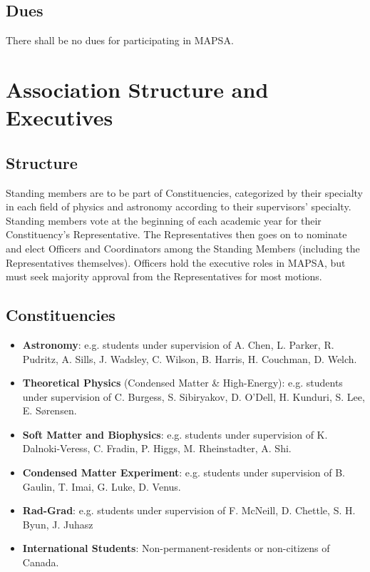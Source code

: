 \documentclass[8pt]{article}
\begin{document}
	\subsection{Dues}
	There shall be no dues for participating in MAPSA.
	
	\section{Association Structure and Executives}
	\subsection{Structure}\label{subsec:structure}
	Standing members are to be part of Constituencies, categorized by their specialty in each field of physics and astronomy according to their supervisors' specialty. Standing members vote at the beginning of each academic year for their Constituency's Representative. The Representatives then goes on to nominate and elect Officers and Coordinators among the Standing Members (including the Representatives themselves). Officers hold the executive roles in MAPSA, but must seek majority approval from the Representatives for most motions. 
	\subsection{Constituencies}
	\begin{itemize}
		\item \textbf{Astronomy}: e.g. students under supervision of A. Chen, L. Parker, R. Pudritz, A. Sills, J. Wadsley, C. Wilson, B. Harris, H. Couchman, D. Welch.
		\item \textbf{Theoretical Physics} (Condensed Matter \& High-Energy): e.g. students under supervision of C. Burgess, S. Sibiryakov, D. O'Dell, H. Kunduri, S. Lee, E. Sørensen.
		\item \textbf{Soft Matter and Biophysics}: e.g. students under supervision of K. Dalnoki-Veress, C. Fradin, P. Higgs, M. Rheinstadter, A. Shi.
		\item \textbf{Condensed Matter Experiment}: e.g. students under supervision of B. Gaulin, T. Imai, G. Luke, D. Venus.
		\item \textbf{Rad-Grad}: e.g. students under supervision of F. McNeill, D. Chettle, S. H. Byun, J. Juhasz
		\item \textbf{International Students}: Non-permanent-residents or non-citizens of Canada.
	\end{itemize}
	
\end{document}

